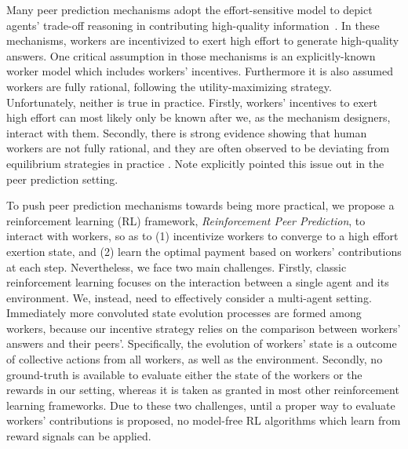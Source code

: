 \documentclass[letterpaper]{article} %
\begin{document}
Many peer prediction mechanisms adopt the effort-sensitive model to depict agents' trade-off reasoning in contributing high-quality information~\cite{witkowski2013dwelling,dasgupta2013crowdsourced,shnayder2016informed,liu2017sequential}. In these mechanisms, workers are incentivized to exert high effort to generate high-quality answers.
One critical assumption in those mechanisms is an explicitly-known worker model which includes workers' incentives. Furthermore it is also assumed workers are fully rational, following the utility-maximizing strategy. Unfortunately, neither is true in practice. Firstly, workers' incentives %
to exert high effort can most likely only be known after we, as the mechanism designers, interact with them. Secondly, there is strong evidence showing that human workers are not fully rational, and they are often observed to be deviating from equilibrium strategies in practice \cite{mckelvey1995quantal,jurca2007robust,gao2014trick}. Note \cite{gao2014trick} explicitly pointed this issue out in the peer prediction setting. 

To push peer prediction mechanisms towards being more practical, we propose a reinforcement learning (RL) framework, \emph{Reinforcement Peer Prediction}, to interact with workers, so as to (1) incentivize workers to converge to a high effort exertion state, and (2) learn the optimal payment based on workers' contributions at each step.
Nevertheless, we face two main challenges.
Firstly, classic reinforcement learning focuses on the interaction between a single agent and its environment. We, instead, need to effectively consider a multi-agent setting. Immediately more convoluted state evolution processes are formed among workers, because our incentive strategy relies on the comparison between workers' answers and their peers'. Specifically, the evolution of workers' state is a outcome of collective actions from all workers, as well as the environment. Secondly, no ground-truth is available to evaluate either the state of the workers or the rewards in our setting, whereas it is taken as granted in most other reinforcement learning frameworks. Due to these two challenges, until a proper way to evaluate workers' contributions is proposed, no model-free RL algorithms which learn from reward signals can be applied.
\end{document}
